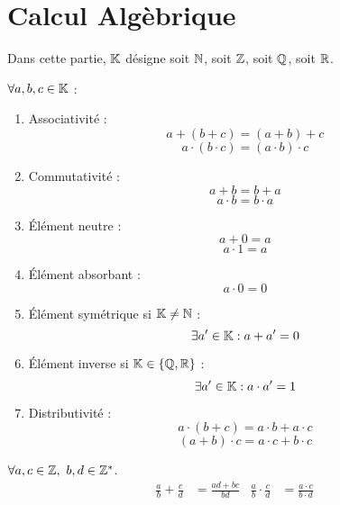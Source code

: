 \chapter{Calcul Algèbrique}
\def\arraystretch{1}

\par \noindent Dans cette partie, $\mathbb{K}$ désigne soit $\mathbb{N}$, soit $\mathbb{Z}$, soit $\mathbb{Q}$, soit $\mathbb{R}$.

\begin{proposition}
    $\forall a, b, c \in \mathbb{K}$ :
    \begin{enumerate}
    	\item Associativité :
    	\[ a + (b + c) = (a + b) + c \]
    	\[ a \cdot (b \cdot c) = (a \cdot b) \cdot c \]
    	\item Commutativité : 
    	\[ a + b = b + a \]
    	\[ a \cdot b = b \cdot a \]
    	\item \'Elément neutre :
    	\[ a + 0 = a \]
    	\[ a \cdot 1 = a \]
    	\item \'Elément absorbant :
    	\[ a \cdot 0 = 0 \]
    	\item \'Elément symétrique si $\mathbb{K} \neq \mathbb{N}$ :
    	\[ \exists a' \in \mathbb{K} : a + a' = 0 \]
    	\item \'Elément inverse si $\mathbb{K} \in \{\mathbb{Q}, \mathbb{R}\}$ :
    	\[ \exists a' \in \mathbb{K} : a \cdot a' = 1 \]
    	\item Distributivité :
    	\[ a \cdot (b + c) = a \cdot b + a \cdot c \]
    	\[ (a + b) \cdot c = a \cdot c + b \cdot c \]
    \end{enumerate}
\end{proposition}

\begin{proposition}
    $\forall a, c \in \mathbb{Z},\ b, d \in \mathbb{Z}^*$.
    \begin{align*}
    	\frac{a}{b} + \frac{c}{d} &= \frac{ad + bc}{bd} & \frac{a}{b} \cdot \frac{c}{d} &= \frac{a \cdot c}{b \cdot d}
    \end{align*}
\end{proposition}

